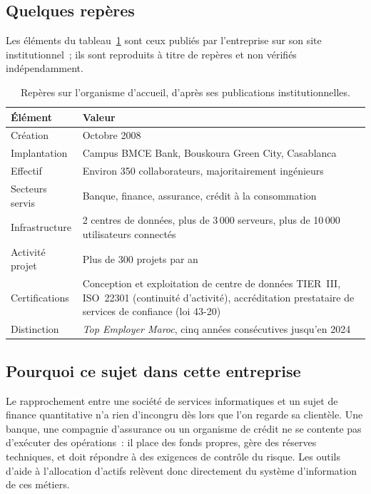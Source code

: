 \subsection{Quelques repères}

Les éléments du tableau~\ref{tab:eurafric} sont ceux publiés par l'entreprise sur
son site institutionnel~; ils sont reproduits à titre de repères et non vérifiés
indépendamment.

\begin{table}[htbp]
  \centering
  \small
  \caption[Repères sur EURAFRIC Information]{Repères sur l'organisme d'accueil,
  d'après ses publications institutionnelles.}
  \label{tab:eurafric}
  \begin{tabular}{@{}p{4.6cm}p{8.4cm}@{}}
    \toprule
    \textbf{Élément} & \textbf{Valeur} \\
    \midrule
    Création & Octobre 2008 \\
    Implantation & Campus BMCE Bank, Bouskoura Green City, Casablanca \\
    Effectif & Environ 350 collaborateurs, majoritairement ingénieurs \\
    Secteurs servis & Banque, finance, assurance, crédit à la consommation \\
    Infrastructure & 2 centres de données, plus de 3\,000 serveurs, plus de
    10\,000 utilisateurs connectés \\
    Activité projet & Plus de 300 projets par an \\
    Certifications & Conception et exploitation de centre de données TIER~III,
    ISO~22301 (continuité d'activité), accréditation prestataire de services de
    confiance (loi 43-20) \\
    Distinction & \emph{Top Employer Maroc}, cinq années consécutives
    jusqu'en 2024 \\
    \bottomrule
  \end{tabular}
\end{table}

\subsection{Pourquoi ce sujet dans cette entreprise}

Le rapprochement entre une société de services informatiques et un sujet de
finance quantitative n'a rien d'incongru dès lors que l'on regarde sa clientèle.
Une banque, une compagnie d'assurance ou un organisme de crédit ne se contente
pas d'exécuter des opérations~: il place des fonds propres, gère des réserves
techniques, et doit répondre à des exigences de contrôle du risque. Les outils
d'aide à l'allocation d'actifs relèvent donc directement du système
d'information de ces métiers.

